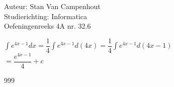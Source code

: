 \documentclass[a4paper]{article}
\begin{document}
  
\noindent \large Auteur: Stan Van Campenhout \\
\noindent \large Studierichting:  Informatica\\
\noindent \large Oefeningenreeks 4A nr. 32.6\\

\medskip

\normalsize

$ \displaystyle\int e^{4x - 1}dx = \dfrac{1}{4}\displaystyle\int e^{4x - 1}d\left(4x\right) = \dfrac{1}{4}\displaystyle\int e^{4x - 1}d\left(4x-1\right) $\\

$ = \dfrac{e^{4x-1}}{4} + c $\\

\begin{thebibliography}{999}
\end{thebibliography}
\end{document}
